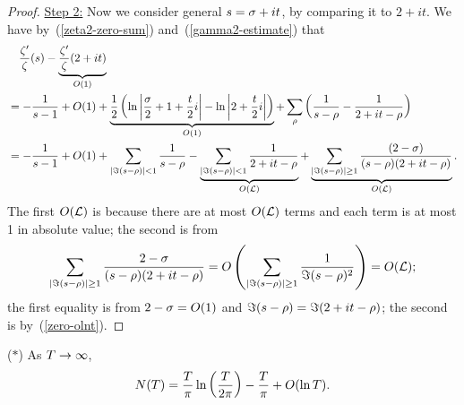 \begin{proof}
\noindent\underline{Step 2:} Now we consider general $s=\si+it$, by comparing it to $2+it$. We have by~(\ref{zeta2-zero-sum}) and~(\ref{gamma2-estimate}) that
\begin{align*}
&\quad \frac{\zeta'}{\zeta}(s)-\underbrace{\frac{\ze'}{\ze}(2+it)}_{O(1)}\\
&=-\rc{s-1}+O(1)+\underbrace{\rc2\pa{\ln\ab{\frac{\si}2+1+\frac t2i}-
\ln\ab{2+\frac t2i}}}_{O(1)}+\sum_{\rh} \pa{\rc{s-\rh}-\rc{2+it-\rh}}\\
&=-\rc{s-1}+O(1)+
\sum_{|\Im(s-\rh)|<1}\rc{s-\rh}-\underbrace{\sum_{|\Im(s-\rh)|<1}\rc{2+it-\rh}}_{O(\cal L)}+
\underbrace{\sum_{|\Im(s-\rh)|\ge1}\frac{(2-\si)}{(s-\rh)(2+it-\rh)}}_{O(\cal L)}.
\end{align*}
The first $O(\cal L)$ is because there are at most $O(\cal L)$ terms and each term is at most 1 in absolute value; the second is from
\[
\sum_{|\Im(s-\rh)|\ge1}\frac{2-\si}{(s-\rh)(2+it-\rh)}=O\pa{\sum_{|\Im(s-\rh)|\ge1}\frac{1}{\Im(s-\rh)^2}}=O(\cal L);
\]
the first equality is from $2-\si=O(1)$ and $\Im(s-\rh)=\Im(2+it-\rh)$; the second is by~(\ref{zero-olnt}).
\end{proof}
\begin{thm}($*$) 
As $T\to \iy$,
\[
N(T)=\frac{T}{\pi}\ln\pf{T}{2\pi}-\frac{T}{\pi}+O(\ln T).
\]
\end{thm}
